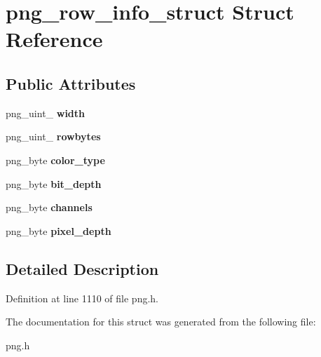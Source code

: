 \hypertarget{structpng__row__info__struct}{\section{png\+\_\+row\+\_\+info\+\_\+struct Struct Reference}
\label{structpng__row__info__struct}
}
\subsection*{Public Attributes}
\begin{DoxyCompactItemize}
\item 
\hypertarget{structpng__row__info__struct_a1ab107da5ffee8100eeaa76cc5ba3e62}{png\+\_\+uint\+\_ {\bfseries width}}\label{structpng__row__info__struct_a1ab107da5ffee8100eeaa76cc5ba3e62}

\item 
\hypertarget{structpng__row__info__struct_a9a8c82137959d6d390ab2ccff87ea83b}{png\+\_\+uint\+\_ {\bfseries rowbytes}}\label{structpng__row__info__struct_a9a8c82137959d6d390ab2ccff87ea83b}

\item 
\hypertarget{structpng__row__info__struct_a646244422549c66e6661cfcdb67c8e28}{png\+\_\+byte {\bfseries color\+\_\+type}}\label{structpng__row__info__struct_a646244422549c66e6661cfcdb67c8e28}

\item 
\hypertarget{structpng__row__info__struct_a6b14d5d0cc32f151c28c568cf1c1f82d}{png\+\_\+byte {\bfseries bit\+\_\+depth}}\label{structpng__row__info__struct_a6b14d5d0cc32f151c28c568cf1c1f82d}

\item 
\hypertarget{structpng__row__info__struct_a7cefee70361a3789a862001aefcd872f}{png\+\_\+byte {\bfseries channels}}\label{structpng__row__info__struct_a7cefee70361a3789a862001aefcd872f}

\item 
\hypertarget{structpng__row__info__struct_a70b84917ef9eabc9b7d29ec96fd01153}{png\+\_\+byte {\bfseries pixel\+\_\+depth}}\label{structpng__row__info__struct_a70b84917ef9eabc9b7d29ec96fd01153}

\end{DoxyCompactItemize}


\subsection{Detailed Description}


Definition at line 1110 of file png.\+h.



The documentation for this struct was generated from the following file\+:\begin{DoxyCompactItemize}
\item 
png.\+h\end{DoxyCompactItemize}
